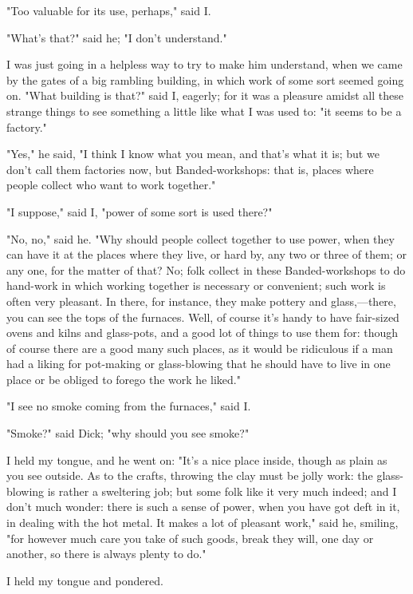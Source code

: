 "Too valuable for its use, perhaps," said I.

"What's that?" said he; "I don't understand."

I was just going in a helpless way to try to make him understand, when
we came by the gates of a big rambling building, in which work of some
sort seemed going on. "What building is that?" said I, eagerly; for it
was a pleasure amidst all these strange things to see something a little
like what I was used to: "it seems to be a factory."

"Yes," he said, "I think I know what you mean, and that's what it is;
but we don't call them factories now, but Banded-workshops: that is,
places where people collect who want to work together."

"I suppose," said I, "power of some sort is used there?"

"No, no," said he. "Why should people collect together to use power,
when they can have it at the places where they live, or hard by, any two
or three of them; or any one, for the matter of that? No; folk collect
in these Banded-workshops to do hand-work in which working together is
necessary or convenient; such work is often very pleasant. In there, for
instance, they make pottery and glass,---there, you can see the tops of
the furnaces. Well, of course it's handy to have fair-sized ovens and
kilns and glass-pots, and a good lot of things to use them for: though
of course there are a good many such places, as it would be ridiculous
if a man had a liking for pot-making or glass-blowing that he should
have to live in one place or be obliged to forego the work he liked."

"I see no smoke coming from the furnaces," said I.

"Smoke?" said Dick; "why should you see smoke?"

I held my tongue, and he went on: "It's a nice place inside, though as
plain as you see outside. As to the crafts, throwing the clay must be
jolly work: the glass-blowing is rather a sweltering job; but some folk
like it very much indeed; and I don't much wonder: there is such a sense
of power, when you have got deft in it, in dealing with the hot metal.
It makes a lot of pleasant work," said he, smiling, "for however much
care you take of such goods, break they will, one day or another, so
there is always plenty to do."

I held my tongue and pondered.


